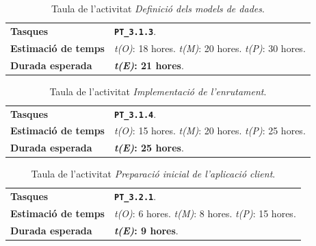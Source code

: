 \documentclass[a4paper,12pt]{ThesisStyle}
\begin{document}
\begin{table}[H]
  \begin{tabularx}{\textwidth}{l | X}
    \toprule
    \rowcolor{Blue}
    \multicolumn{2}{c}{\texttt{\textbf{A8:}} Definició dels models de dades}\\
    \midrule[0.9pt]
    \textbf{Tasques}                 & \texttt{\textbf{PT\_3.1.3}}.\\
    \midrule
    \textbf{Estimació de temps}      & \textit{t(O)}: 18 hores.
    \newline \textit{t(M)}: 20 hores.
    \newline \textit{t(P)}: 30 hores.\\
    \midrule
    \textbf{Durada esperada}         & \textbf{\textit{t(E)}: 21 hores}.\\
    \bottomrule
  \end{tabularx}
  \caption{\label{taula:a8} Taula de l'activitat \emph{Definició dels models de dades}.}
\end{table}

\begin{table}[H]
  \begin{tabularx}{\textwidth}{l | X}
    \toprule
    \rowcolor{Blue}
    \multicolumn{2}{c}{\texttt{\textbf{A9:}} Implementació de l'enrutament}\\
    \midrule[0.9pt]
    \textbf{Tasques}                 & \texttt{\textbf{PT\_3.1.4}}.\\
    \midrule
    \textbf{Estimació de temps}      & \textit{t(O)}: 15 hores.
    \newline \textit{t(M)}: 20 hores.
    \newline \textit{t(P)}: 25 hores.\\
    \midrule
    \textbf{Durada esperada}         & \textbf{\textit{t(E)}: 25 hores}.\\
    \bottomrule
  \end{tabularx}
  \caption{\label{taula:a9} Taula de l'activitat \emph{Implementació de l'enrutament}.}
\end{table}

\begin{table}[H]
  \begin{tabularx}{\textwidth}{l | X}
    \toprule
    \rowcolor{Blue}
    \multicolumn{2}{c}{\texttt{\textbf{A10:}} Preparació inicial de l'aplicació client}\\
    \midrule[0.9pt]
    \textbf{Tasques}                 & \texttt{\textbf{PT\_3.2.1}}.\\
    \midrule
    \textbf{Estimació de temps}      & \textit{t(O)}: 6 hores.
    \newline \textit{t(M)}: 8 hores.
    \newline \textit{t(P)}: 15 hores.\\
    \midrule
    \textbf{Durada esperada}         & \textbf{\textit{t(E)}: 9 hores}.\\
    \bottomrule
  \end{tabularx}
  \caption{\label{taula:a10} Taula de l'activitat \emph{Preparació inicial de l'aplicació client}.}
\end{table}
\end{document}
